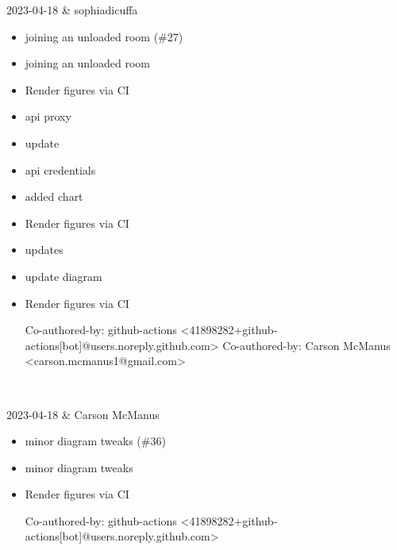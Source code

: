 2023-04-18 & sophiadicuffa
\begin{itemize}[topsep=0pt,itemsep=0pt,parsep=0pt,partopsep=0pt,leftmargin=12pt]
\item joining an unloaded room (\#27)

\item joining an unloaded room

\item Render figures via CI

\item api proxy

\item update

\item api credentials

\item added chart

\item Render figures via CI

\item updates

\item update diagram

\item Render figures via CI



Co-authored-by: github-actions <41898282+github-actions[bot]@users.noreply.github.com>
Co-authored-by: Carson McManus <carson.mcmanus1@gmail.com>
\end{itemize}
\\ \hline

2023-04-18 & Carson McManus
\begin{itemize}[topsep=0pt,itemsep=0pt,parsep=0pt,partopsep=0pt,leftmargin=12pt]
\item minor diagram tweaks (\#36)

\item minor diagram tweaks

\item Render figures via CI



Co-authored-by: github-actions <41898282+github-actions[bot]@users.noreply.github.com>
\end{itemize}
\\ \hline

